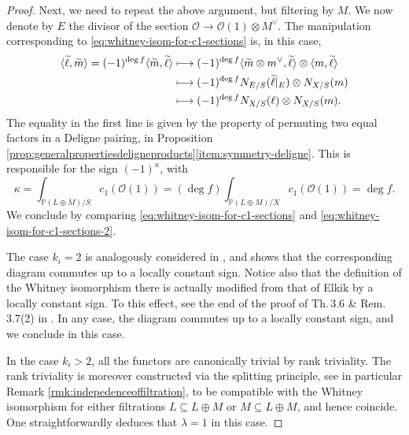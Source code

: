 \documentclass[11pt]{article}
\newcommand\mto{\mathchoice{\longmapsto}{\mapsto}{\mapsto}{\mapsto}}
\theoremstyle{plain}
\theoremstyle{definition}
\newcommand{\PBbb}{\mathbb P}
\newcommand{\Ocal}{\mathcal O}
\begin{document}
\begin{proof}
Next, we need to repeat the above argument, but filtering by $M$. We now denote by $E$ the divisor of the section $\Ocal\to \Ocal(1)\otimes M^{\vee}$. The manipulation corresponding to \eqref{eq:whitney-isom-for-c1-sections} is, in this case,
\begin{equation}\label{eq:whitney-isom-for-c1-sections-2}
\begin{split}
\langle\widetilde{\ell},\widetilde{m}\rangle=(-1)^{\deg f}\langle\widetilde{m},\widetilde{\ell}\rangle &\mto (-1)^{\deg f}\langle\widetilde{m}\otimes m^{\vee},\widetilde{\ell}\rangle\otimes \langle m,\widetilde{\ell}\rangle\\
&\mto (-1)^{\deg f}N_{E/S}(\widetilde{\ell}|_{E})\otimes N_{X/S}(m)\\
&\mto (-1)^{\deg f}N_{X/S}(\ell)\otimes N_{X/S}(m).
\end{split}
\end{equation}
The equality in the first line is given by the property of permuting two equal factors in a Deligne pairing, in Proposition \ref{prop:generalpropertiesdeligneproducts}\eqref{item:symmetry-deligne}. This is responsible for the sign $(-1)^{\kappa}$, with
\begin{displaymath}
\kappa=\int_{\PBbb(L\oplus M)/S}c_{1}(\Ocal(1))=(\deg f)\int_{\PBbb(L\oplus M)/X}c_{1}(\Ocal(1))=\deg f.
\end{displaymath}
We conclude by comparing \eqref{eq:whitney-isom-for-c1-sections} and \eqref{eq:whitney-isom-for-c1-sections-2}.

The case $k_i = 2 $ is analogously considered in \cite[Prop.\,3.9]{Eriksson-Freixas-Wentworth}, and shows that the corresponding diagram commutes up to a locally constant sign. Notice also that the definition of the Whitney isomorphism there is actually modified from that of Elkik by a locally constant sign. To this effect, see the end of the proof of Th.\,3.6 \& Rem.\,3.7(2) in \cite{Eriksson-Freixas-Wentworth}. In any case, the diagram commutes up to a locally constant sign, and we conclude in this case.

In the case $k_i > 2$, all the functors are canonically trivial by rank triviality. The rank triviality is moreover constructed via the splitting principle, see in particular Remark \ref{rmk:indepedenceoffiltration}, to be compatible with the Whitney isomorphism for either filtrations $L \subseteq L \oplus M$ or $M \subseteq L \oplus M$, and hence coincide. One straightforwardly deduces that $\lambda = 1$ in this case.
\end{proof}
\end{document}
